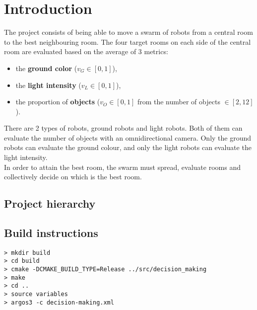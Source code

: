 \section{Introduction}

The project consists of being able to move a swarm of robots from a central room
to the best neighbouring room. The four target rooms on each side of the central
room are evaluated based on the average of 3 metrics:

\begin{itemize}
    \item the \textbf{ground color} ($v_G \in [0,1]$),
    \item the \textbf{light intensity} ($v_L \in [0,1]$),
    \item the proportion of \textbf{objects} ($v_O \in [0,1]$ from the number
    of objects
$\in [2,12]$).
\end{itemize}

\noindent There are 2 types of robots, ground robots and light robots. Both of
them can evaluate the number of objects with an omnidirectional camera. Only the
ground robots can evaluate the ground colour, and only the light robots can
evaluate the light intensity.\\

\noindent In order to attain the best room, the swarm must spread, evaluate rooms and
collectively decide on which is the best room.

\subsection{Project hierarchy}

\begin{framed}
\end{framed}

\subsection {Build instructions}

\begin{lstlisting}
> mkdir build
> cd build
> cmake -DCMAKE_BUILD_TYPE=Release ../src/decision_making
> make
> cd ..
> source variables
> argos3 -c decision-making.xml
\end{lstlisting}

\newpage
